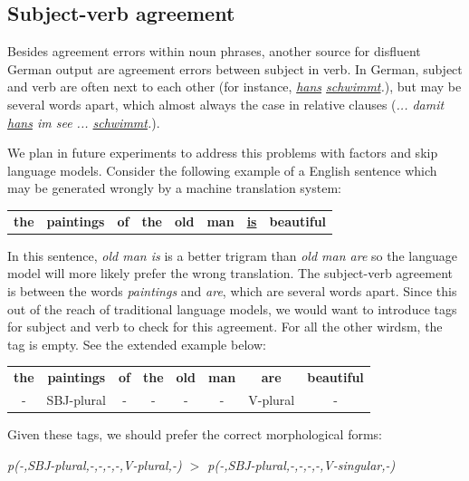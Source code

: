 \documentclass[11pt]{report}
\theoremstyle{plain}
\begin{document}
{\subsection{Subject-verb agreement}
Besides agreement errors within noun phrases, another source for disfluent German output are agreement errors between subject in verb. In German, subject and verb are often next to each other (for instance, {\em \underline{hans} \underline{schwimmt}.}), but may be several words apart, which almost always the case in relative clauses ({\em ... damit \underline{hans} im see ... \underline{schwimmt}.}).

We plan in future experiments to address this problems with factors and skip language models. Consider the following example of a English sentence which may be generated wrongly by a machine translation system: 

{\em \begin{center} 
\begin{tabular}{cccccccc}
\bf the & \bf paintings & \bf of & \bf the & \bf old & \bf man & \underline{\bf is} & \bf beautiful \\
\end{tabular}
\end{center}}

In this sentence, {\em old man is} is a better trigram than {\em old man are} so the language model will more likely prefer the wrong translation. The subject-verb agreement is between the words {\em paintings} and {\em are}, which are several words apart. Since this out of the reach of traditional language models, we would want to introduce tags for subject and verb to check for this agreement. For all the other wirdsm, the tag is empty. See the extended example below:

{\em \begin{center}
\begin{tabular}{cccccccc}
\bf the & \bf paintings & \bf of & \bf the & \bf old & \bf man & \bf are & \bf beautiful \\
- & SBJ-plural & - & - & - & - & V-plural & - \\
\end{tabular}
\end{center}} 

Given these tags, we should prefer the correct morphological forms:
\begin{center}
{\em p(-,SBJ-plural,-,-,-,-,V-plural,-) $>$ p(-,SBJ-plural,-,-,-,-,V-singular,-)}
\end{center}

}
\end{document}

